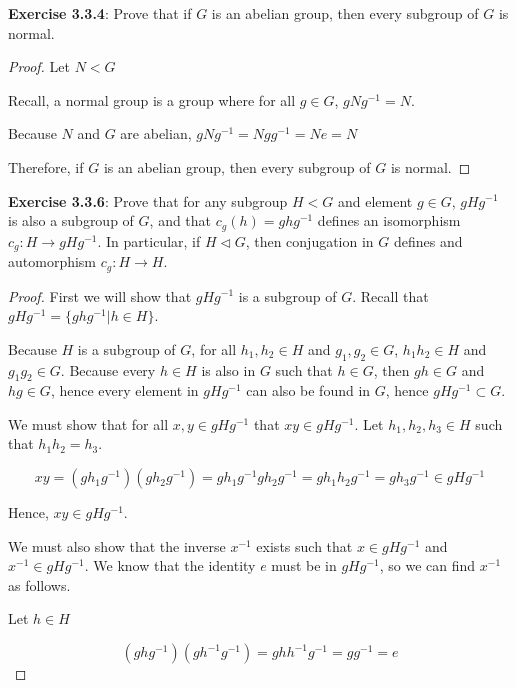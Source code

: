 \documentclass[a4paper]{article}
\begin{document}
\begin{myparindent}{0pt}
\textbf{Exercise 3.3.4}:
Prove that if $G$ is an abelian group, then every subgroup of $G$ is normal.
\newline

\begin{proof}

Let $N < G$

Recall, a normal group is a group where for all $g \in G$, $gNg^{-1} = N$.

Because $N$ and $G$ are abelian, $gNg^{-1} = Ngg^{-1} = Ne = N$

Therefore, if $G$ is an abelian group, then every subgroup of $G$ is normal.
\end{proof}

\textbf{Exercise 3.3.6}:
Prove that for any subgroup $H < G$ and element $g \in G$, $gHg^{-1}$ is also
a subgroup of $G$, and that $c_g(h) = ghg^{-1}$ defines an isomorphism
$c_g: H \rightarrow gHg^{-1}$. In particular, if $H \triangleleft G$, then
conjugation in $G$ defines and automorphism $c_g: H \rightarrow H$.
\newline

\begin{proof}
  First we will show that $gHg^{-1}$ is a subgroup of $G$. Recall that
  $gHg^{-1} = \{ ghg^{-1} | h \in H \}$. \newline

  Because $H$ is a subgroup of $G$, for all $h_1, h_2 \in H$ and $g_1, g_2 \in G$,
  $h_1 h_2 \in H$ and $g_1 g_2 \in G$. Because every $h \in H$ is also in $G$ such
  that $h \in G$, then $gh \in G$ and $hg \in G$, hence every element in $gHg^{-1}$
  can also be found in $G$, hence $gHg^{-1} \subset G$. \newline

  We must show that for all $x, y \in gHg^{-1}$ that $xy \in gHg^{-1}$.
  Let $h_1, h_2, h_3 \in H$ such that $h_1 h_2 = h_3$.

  \[ xy = (g h_1 g^{-1})(g h_2 g^{-1}) = g h_1 g^{-1}g h_2 g^{-1} = g h_1 h_2 g^{-1} = g h_3 g^{-1} \in gHg^{-1} \]

  Hence, $xy \in gHg^{-1}$. \newline

  We must also show that the inverse $x^{-1}$ exists such that $x \in gHg^{-1}$
  and $x^{-1} \in gHg^{-1}$.
  We know that the identity $e$ must be in $gHg^{-1}$, so we can find $x^{-1}$
  as follows. \newline

  Let $h \in H$

  \[ (ghg^{-1})(gh^{-1}g^{-1}) = ghh^{-1}g^{-1} = gg^{-1} = e \]


\end{proof}
\end{myparindent}
\end{document}
